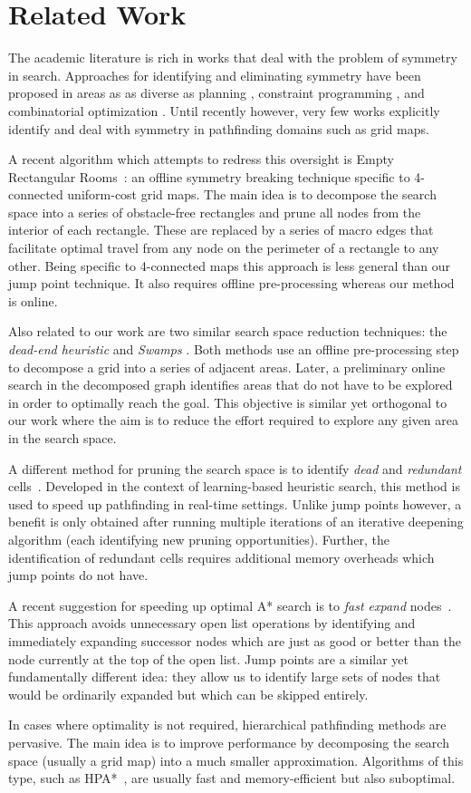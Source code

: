 \section{Related Work}
\label{sec:relatedwork}
The academic literature is rich in works that deal with the problem of symmetry
in search.  Approaches for identifying and eliminating symmetry have been
proposed in areas as as diverse as planning \cite{fox99}, constraint programming
\cite{gent00}, and combinatorial optimization \cite{fukunaga08}. Until recently
however, very few works explicitly identify and deal with symmetry in pathfinding
domains such as grid maps.

A recent algorithm which attempts to redress this oversight is Empty Rectangular
Rooms~\cite{harabor10}: an offline symmetry breaking technique specific to
4-connected uniform-cost grid maps.  The main idea is to decompose the search
space into a series of obstacle-free rectangles and prune all nodes from the interior
of each rectangle. These are replaced by a series of macro edges that
facilitate optimal travel from any node on the perimeter of a rectangle to any
other.  Being specific to 4-connected maps this approach is less general than
our jump point technique. It also requires offline pre-processing whereas our
method is online.

Also related to our work are two similar search space reduction techniques: the
\emph{dead-end heuristic} \cite{bjornsson06} and \emph{Swamps} \cite{pochter10}.
Both methods use an offline pre-processing step to decompose a grid into a
series of adjacent areas.  Later, a preliminary online search in the decomposed
graph identifies areas that do not have to be explored in order to optimally
reach the goal.  This objective is similar yet orthogonal to our work where
the aim is to reduce the effort required to explore any given area in the search
space.

A different method for pruning the search space is to identify \emph{dead} and
\emph{redundant} cells~\cite{sturtevant10}.  Developed in the context of
learning-based heuristic search, this method is used to speed up pathfinding in
real-time settings.  Unlike jump points however, a benefit is only obtained
after running multiple iterations of an iterative deepening algorithm (each
identifying new pruning opportunities).  Further, the identification of
redundant cells requires additional memory overheads which jump points do not
have.

A recent suggestion for speeding up optimal A* search is to \emph{fast expand}
nodes~\cite{sun09}.  This approach avoids unnecessary open list operations by
identifying and immediately expanding successor nodes which are just as good or
better than the node currently at the top of the open list.  Jump points are a
similar yet fundamentally different idea: they allow us to identify large sets
of nodes that would be ordinarily expanded but which can be skipped entirely.
 
In cases where optimality is not required, hierarchical pathfinding methods
are pervasive.  The main idea is to improve performance by decomposing the
search space (usually a grid map) into a much smaller approximation.  Algorithms
of this type, such as HPA*~\cite{botea04}, are  usually fast and
memory-efficient but also suboptimal.
